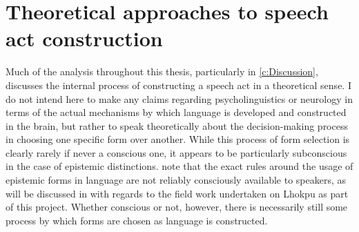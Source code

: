 \section{Theoretical approaches to speech act construction}\label{ss:Discussion:SpeechActs}
Much of the analysis throughout this thesis, particularly in \cref{c:Discussion}, discusses the internal process of constructing a speech act in a theoretical sense. I do not intend here to make any claims regarding psycholinguistics or neurology in terms of the actual mechanisms by which language is developed and constructed in the brain, but rather to speak theoretically about the decision-making process in choosing one specific form over another. While this process of form selection is clearly rarely if never a conscious one, it appears to be particularly subconscious in the case of epistemic distinctions.  note that the exact rules around the usage of epistemic forms in language are not reliably consciously available to speakers, as will be discussed in  with regards to the field work undertaken on Lhokpu as part of this project. Whether conscious or not, however, there is necessarily still some process by which forms are chosen as language is constructed.

